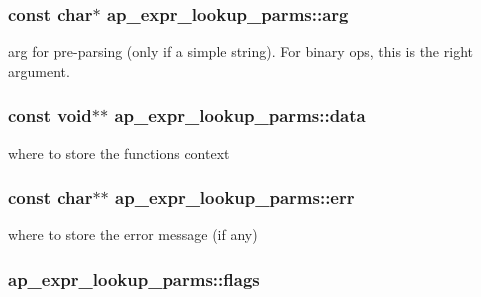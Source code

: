 \subsubsection[{\texorpdfstring{arg}{arg}}]{\setlength{\rightskip}{0pt plus 5cm}const char$\ast$ ap\+\_\+expr\+\_\+lookup\+\_\+parms\+::arg}\hypertarget{structap__expr__lookup__parms_af3447fe82681f51295039402e76997b5}{}\label{structap__expr__lookup__parms_af3447fe82681f51295039402e76997b5}
arg for pre-\/parsing (only if a simple string). For binary ops, this is the right argument. 
\subsubsection[{\texorpdfstring{data}{data}}]{\setlength{\rightskip}{0pt plus 5cm}const {\bf void}$\ast$$\ast$ ap\+\_\+expr\+\_\+lookup\+\_\+parms\+::data}\hypertarget{structap__expr__lookup__parms_a20bf2c354b95644f425690e44758a932}{}\label{structap__expr__lookup__parms_a20bf2c354b95644f425690e44758a932}
where to store the function\textquotesingle{}s context 
\subsubsection[{\texorpdfstring{err}{err}}]{\setlength{\rightskip}{0pt plus 5cm}const char$\ast$$\ast$ ap\+\_\+expr\+\_\+lookup\+\_\+parms\+::err}\hypertarget{structap__expr__lookup__parms_a039a4890bcae06435700173d456642e5}{}\label{structap__expr__lookup__parms_a039a4890bcae06435700173d456642e5}
where to store the error message (if any) 
\subsubsection[{\texorpdfstring{flags}{flags}}]{ ap\+\_\+expr\+\_\+lookup\+\_\+parms\+::flags}\hypertarget{structap__expr__lookup__parms_ab278497f84abc9c4bc823361bd851a8b}{}\label{structap__expr__lookup__parms_ab278497f84abc9c4bc823361bd851a8b}

